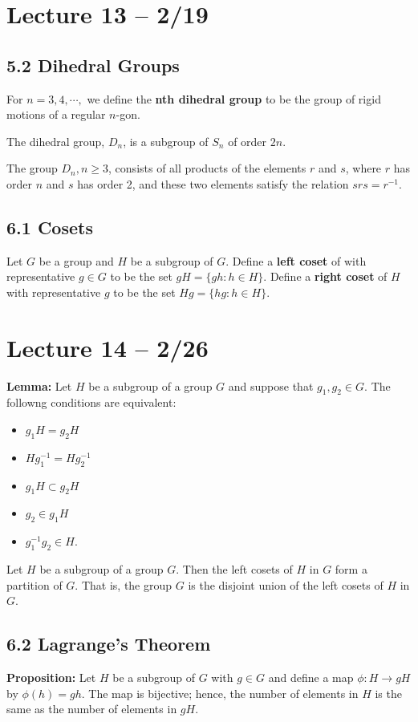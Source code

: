 \documentclass{article}
\begin{document}
\section{Lecture 13 -- 2/19}
\subsection{5.2 Dihedral Groups}
For $n=3,4,\cdots,$ we define the \textbf{nth dihedral group} to be the group of rigid motions of a regular $n$-gon.
\begin{theorem}
  The dihedral group, $D_n$, is a subgroup of $S_n$ of order $2n$.
\end{theorem}
\begin{theorem}
  The group $D_n, n\geq3$, consists of all products of the elements $r$ and $s$, where $r$ has order $n$ and $s$ has order 2, and these two elements satisfy the relation $srs=r^{-1}$.
\end{theorem}
\subsection{6.1 Cosets}
Let $G$ be a group and $H$ be a subgroup of $G$. Define a \textbf{left coset} of with representative $g\in G$ to be the set $gH=\{gh:h\in H\}$. Define a \textbf{right coset} of $H$ with representative $g$ to be the set $Hg=\{hg:h\in H\}$.
\section{Lecture 14 -- 2/26}
\textbf{Lemma: } Let $H$ be a subgroup of a group $G$ and suppose that $g_1,g_2\in G$. The followng conditions are equivalent:
\begin{itemize}
  \item $g_1H=g_2H$
  \item $Hg_1^{-1}=Hg_2^{-1}$
  \item $g_1H\subset g_2H$
  \item $g_2\in g_1H$
  \item $g_1^{-1}g_2\in H$.
\end{itemize}
\begin{theorem}
  Let $H$ be a subgroup of a group $G$. Then the left cosets of $H$ in $G$ form a partition of $G$. That is, the group $G$ is the disjoint union of the left cosets of $H$ in $G$.
\end{theorem}
\subsection{6.2 Lagrange's Theorem}
\textbf{Proposition: }Let $H$ be a subgroup of $G$ with $g\in G$ and define a map $\phi: H\to gH$ by $\phi(h)=gh$. The map is bijective; hence, the number of elements in $H$ is the same as the number of elements in $gH$.
\end{document}
